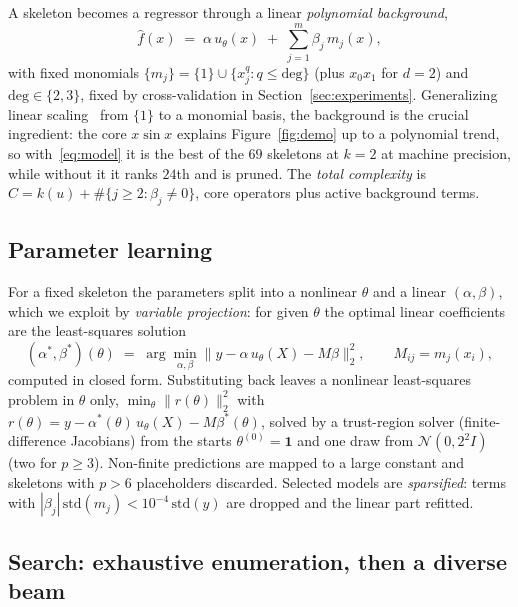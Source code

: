 \documentclass{article}
\begin{document}
A skeleton becomes a regressor through a linear \emph{polynomial background},
\begin{equation}
  \hat f(x) \;=\; \alpha\, u_\theta(x) \;+\; \textstyle\sum_{j=1}^{m} \beta_j\, m_j(x),
  \label{eq:model}
\end{equation}
with fixed monomials $\{m_j\} = \{1\} \cup \{x_j^q : q \le \mathrm{deg}\}$ (plus
$x_0x_1$ for $d=2$) and $\mathrm{deg} \in \{2,3\}$, fixed by cross-validation
in Section~\ref{sec:experiments}.
Generalizing linear scaling~\citep{Keijzer} from $\{1\}$ to a monomial basis,
the background is the crucial ingredient: the core $x\sin x$ explains
Figure~\ref{fig:demo} up to a polynomial trend, so with~\eqref{eq:model} it is
the best of the $69$ skeletons at $k=2$ at machine precision, while without it
it ranks $24$th and is pruned. The \emph{total complexity} is $C = k(u) +
\#\{j \ge 2: \beta_j \neq 0\}$, core operators plus active background terms.

\subsection{Parameter learning}
\label{sec:learning}

For a fixed skeleton the parameters split into a nonlinear $\theta$ and a linear
$(\alpha,\beta)$, which we exploit by \emph{variable projection}: for given
$\theta$ the optimal linear coefficients are the least-squares solution
\begin{equation}
  (\alpha^*,\beta^*)(\theta) \;=\; \arg\min_{\alpha,\beta}
  \bigl\lVert y - \alpha\, u_\theta(X) - M\beta \bigr\rVert_2^2,
  \qquad M_{ij}=m_j(x_i),
  \label{eq:varpro}
\end{equation}
computed in closed form. Substituting back leaves a nonlinear least-squares
problem in $\theta$ only, $\min_\theta \lVert r(\theta)\rVert_2^2$ with
$r(\theta) = y - \alpha^*(\theta)\,u_\theta(X) - M\beta^*(\theta)$, solved by a
trust-region solver (finite-difference Jacobians) from the starts $\theta^{(0)}
= \mathbf{1}$ and one draw from $\mathcal{N}(0, 2^2 I)$ (two for $p\ge3$).
Non-finite predictions are mapped to a large constant and skeletons with $p > 6$
placeholders discarded. Selected models are \emph{sparsified}: terms with
$|\beta_j|\,\mathrm{std}(m_j) < 10^{-4}\,\mathrm{std}(y)$ are dropped and the
linear part refitted.

\subsection{Search: exhaustive enumeration, then a diverse beam}
\label{sec:search}
\end{document}
